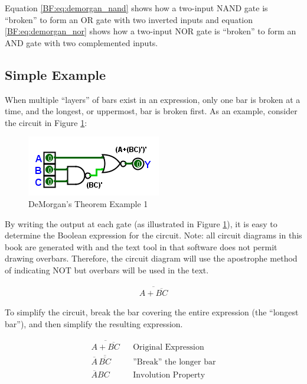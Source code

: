 Equation \ref{BF:eq:demorgan_nand} shows how a two-input \textsf{NAND} gate is ``broken'' to form an \textsf{OR} gate with two inverted inputs and equation \ref{BF:eq:demorgan_nor} shows how a two-input \textsf{NOR} gate is ``broken'' to form an \textsf{AND} gate with two complemented inputs.

\subsection{Simple Example}
\label{BF:subsec:simple_example_demorgan}

When multiple ``layers'' of bars exist in an expression, only one bar is broken at a time, and the longest, or uppermost, bar is broken first. As an example, consider the circuit in Figure \ref{fig:04_29}: 

\begin{figure}[H]
	\centering
	\includegraphics[width=\maxwidth{.95\linewidth}]{gfx/04_29}
	\caption{DeMorgan's Theorem Example 1}
	\label{fig:04_29}
\end{figure}

By writing the output at each gate (as illustrated in Figure \ref{fig:04_29}), it is easy to determine the Boolean expression for the circuit. Note: all circuit diagrams in this book are generated with \Le and the text tool in that software does not permit drawing overbars. Therefore, the circuit diagram will use the apostrophe method of indicating NOT but overbars will be used in the text.

\begin{align}
  \label{BF:eq:demorgan_simple_example}
  \overline{A+\overline{BC}}
\end{align}

To simplify the circuit, break the bar covering the entire expression (the ``longest bar''), and then simplify the resulting expression.

\begin{align}
  \label{BF:eq:demorgan_simple_solved}
  \overline{A+\overline{BC}} && \text{Original Expression} \\
  \nonumber
  \overline{A}\,\overline{\overline{BC}} && \text{''Break'' the longer bar} \\
  \nonumber
  \overline{A}BC && \text{Involution Property}
\end{align}

